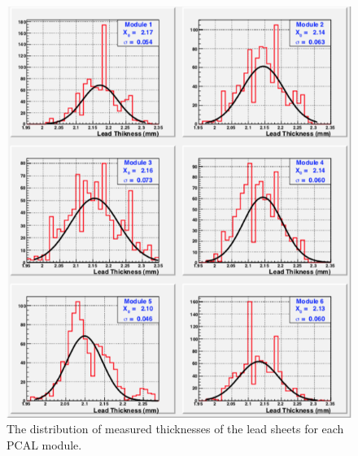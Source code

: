 \begin{figure}[hbt]
\centering
\includegraphics[width=0.95\columnwidth,keepaspectratio]{img/S4_5.png}
\caption{The distribution of measured thicknesses of the lead sheets for each PCAL module.}
\label{fig:S4_5}
\end{figure}


